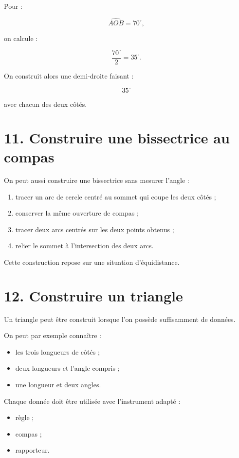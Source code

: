 Pour :

\[
\widehat{AOB}=70^\circ,
\]

on calcule :

\[
\dfrac{70^\circ}{2}=35^\circ.
\]

On construit alors une demi-droite faisant :

\[
35^\circ
\]

avec chacun des deux côtés.

\section{11. Construire une bissectrice au compas}

On peut aussi construire une bissectrice sans mesurer l’angle :

\begin{enumerate}
\item tracer un arc de cercle centré au sommet qui coupe les deux côtés ;
\item conserver la même ouverture de compas ;
\item tracer deux arcs centrés sur les deux points obtenus ;
\item relier le sommet à l’intersection des deux arcs.
\end{enumerate}

Cette construction repose sur une situation d’équidistance.

\section{12. Construire un triangle}

Un triangle peut être construit lorsque l’on possède suffisamment de données.

On peut par exemple connaître :

\begin{itemize}
\item les trois longueurs de côtés ;
\item deux longueurs et l’angle compris ;
\item une longueur et deux angles.
\end{itemize}

Chaque donnée doit être utilisée avec l’instrument adapté :

\begin{itemize}
\item règle ;
\item compas ;
\item rapporteur.
\end{itemize}

